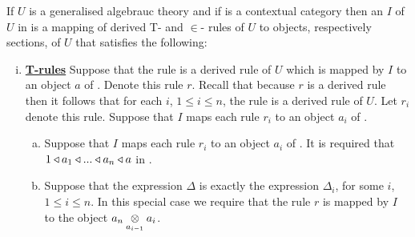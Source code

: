 

\begin{definition}
If $U$ is a generalised algebrauc theory and if \catcw is a contextual category then an  $I$ of $U$ in \catcw is a  mapping 
of derived T- and $\in$- rules of $U$ to objects, respectively sections, of $U$ that satisfies the following:
\begin{enumerate}[(i)]
\setlength\itemindent{2cm}
\item \underline{\textbf{T-rules}} 
Suppose that  the rule
 is a derived rule of $U$ which is mapped by $I$ to an object $a$ of \catc. Denote this rule $r$. Recall that because $r$ is a derived rule then it follows  that for each $i$, 
$1 \leq i \leq n$, the rule  is a derived rule of $U$. Let $r_i$ denote this rule.
Suppose that $I$ maps each rule $r_i$ to an object $a_i$ of \catcw.
\begin{enumerate}[(a)]
\item 
Suppose that $I$ maps each rule $r_i$ to an object $a_i$ of \catcw.
It is required that $1 \base a_1 \base ... \base a_n \base a$ in \catc.
\item Suppose that the  expression $\Delta$ is exactly the expression $\Delta_i$, for some $i$, $1 \leq i \leq n$. In this special case we require that the rule $r$  is mapped by $I$ to the object 
$\crossx{a_n}{a_i}{a_{i-1}}$.
\end{enumerate} 


\end{enumerate}
\end{definition}
